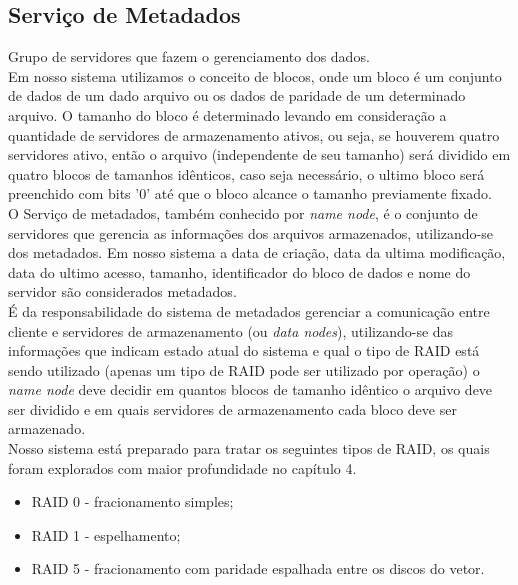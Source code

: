 	\subsection{Serviço de Metadados}
		Grupo de servidores que fazem o gerenciamento dos dados.\\
		
		Em nosso sistema utilizamos o conceito de blocos, onde um bloco é um conjunto de dados de um dado arquivo ou os dados de paridade de um determinado arquivo. O tamanho do bloco é determinado levando em consideração a quantidade de servidores de armazenamento ativos, ou seja, se houverem quatro servidores ativo, então o arquivo (independente de seu tamanho) será dividido em quatro blocos de tamanhos idênticos, caso seja necessário, o ultimo bloco será preenchido com bits '0' até que o bloco alcance o tamanho previamente fixado.
		\\ 
		
		O Serviço de metadados, também conhecido por \textit{name node}, é o conjunto de servidores que gerencia as informações dos arquivos armazenados, utilizando-se dos metadados. Em nosso sistema a data de criação, data da ultima modificação, data do ultimo acesso, tamanho, identificador do bloco de dados e nome do servidor são considerados metadados. 
		\\
		
		É da responsabilidade do sistema de metadados gerenciar a comunicação entre cliente e servidores de armazenamento (ou  \textit{data nodes}), utilizando-se das informações que indicam  estado atual do sistema e qual o tipo de RAID está sendo utilizado (apenas um tipo de RAID pode ser utilizado por operação) o \textit{name node} deve decidir em quantos blocos de tamanho idêntico o arquivo deve ser dividido e em quais servidores de armazenamento cada bloco deve ser armazenado.
		\\ 
		
		Nosso sistema está preparado para tratar os seguintes tipos de RAID, os quais foram explorados com maior profundidade no capítulo 4.
		\\
		
		\begin{itemize}
			\item RAID 0 - fracionamento simples;
			\item RAID 1 - espelhamento;
			\item RAID 5 - fracionamento com paridade espalhada entre os discos do vetor.
		\end{itemize}
		
